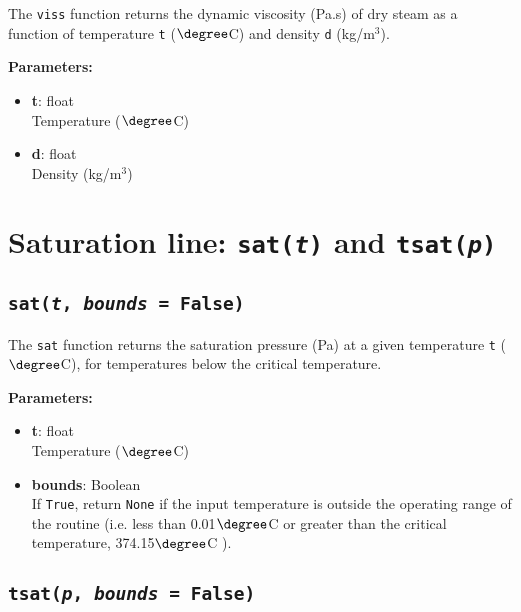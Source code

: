 The \texttt{viss} function returns the dynamic viscosity (Pa.s) of dry steam as a function of temperature \texttt{t} ($\degree$C) and density \texttt{d} (kg/m$^3$).

\textbf{Parameters:}
\begin{itemize}
\item \textbf{t}: float\\
  Temperature ($\degree$C)
\item \textbf{d}: float\\
  Density (kg/m$^3$)
\end{itemize}

\section{Saturation line: \texttt{sat(\emph{t})} and \texttt{tsat(\emph{p})}}

\begin{snugshade}
\subsection{\texttt{sat(\emph{t}, \emph{bounds} = False)}}
\end{snugshade}
\label{sec:t2thermo:sat}

The \texttt{sat} function returns the saturation pressure (Pa) at a given temperature \texttt{t} ($\degree$C), for temperatures below the critical temperature.

\textbf{Parameters:}
\begin{itemize}
\item \textbf{t}: float\\
  Temperature ($\degree$C)
\item \textbf{bounds}: Boolean\\
  If \texttt{True}, return \texttt{None} if the input temperature is outside the operating range of the routine (i.e. less than 0.01$\degree$C or greater than the critical temperature, 374.15$\degree$C ).
\end{itemize}

\begin{snugshade}
\subsection{\texttt{tsat(\emph{p}, \emph{bounds} = False)}}
\end{snugshade}
\label{sec:t2thermo:tsat}


